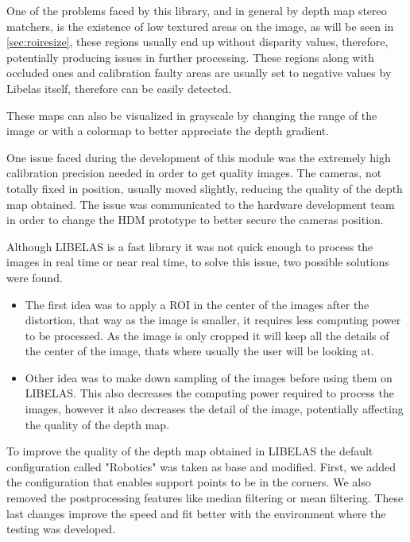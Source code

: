 \documentclass[10pt,a4paper,twocolumn,twoside]{article}
\begin{document}
	 One of the problems faced by this library, and in general by depth map stereo matchers, is the existence of low textured areas on the image, as will be seen in \ref{sec:roiresize}, these regions usually end up without disparity values, therefore, potentially producing issues in further processing. These regions along with occluded ones and calibration faulty areas are usually set to negative values by Libelas itself, therefore can be easily detected.  
	 
	 These maps can also be visualized in grayscale by changing the range of the image or with a colormap to better appreciate the depth gradient. 
	 
	 One issue faced during the development of this module was the extremely high calibration precision needed in order to get quality images. The cameras, not totally fixed in position, usually moved slightly, reducing the quality of the depth map obtained. The issue was communicated to the hardware development team in order to change the HDM prototype to better secure the cameras position.  
	 
	 Although LIBELAS is a fast library it was not quick enough to process the images in real time or near real time, to solve this issue, two possible solutions were found. 
	 
	 \begin{itemize}
	 	\item The first idea was to apply a ROI in the center of the images after the distortion, that way as the image is smaller, it requires less computing power to be processed. As the image is only cropped it will keep all the details of the center of the image, thats where usually the user will be looking at.  
	 	 
	 	\item Other idea was to make down sampling of the images before using them on LIBELAS. This also decreases the computing power required to process the images, however it also decreases the detail of the image, potentially affecting the quality of the depth map.  
 	 \end{itemize}
	 
	 To improve the quality of the depth map obtained in LIBELAS the default configuration called "Robotics" was taken as base and modified. First, we added the configuration that enables support points to be in the corners. We also removed the postprocessing features like median filtering or mean filtering. These last changes improve the speed and fit better with the environment where the testing was developed.
	 
\end{document}
